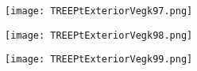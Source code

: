 \documentclass[pdf]{beamer}
\begin{document}
\begin{frame}
\begin{figure}[!h]
\centering
\texttt{[image: TREEPtExteriorVegk97.png]}
\end{figure}
\end{frame}

\begin{frame}
\begin{figure}[!h]
\centering
\texttt{[image: TREEPtExteriorVegk98.png]}
\end{figure}
\end{frame}

\begin{frame}
\begin{figure}[!h]
\centering
\texttt{[image: TREEPtExteriorVegk99.png]}
\end{figure}
\end{frame}
\end{document}
